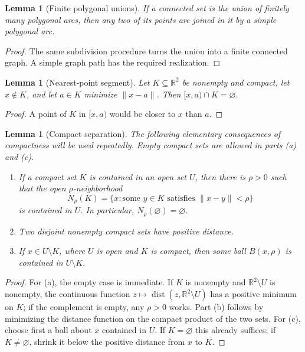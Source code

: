 \documentclass[11pt]{article}
\theoremstyle{mainplain}
\newtheorem{lemma}[theorem]{Lemma}
\theoremstyle{mainroman}
\newtheorem{longlemma}[theorem]{Lemma}
\theoremstyle{definition}
\newcommand{\alphlabels}{\renewcommand{\labelenumi}{\textup{(\alph{enumi})}}%
  \renewcommand{\theenumi}{\alph{enumi}}}
\numberwithin{equation}{section}
\begin{document}
\begin{lemma}[Finite polygonal unions]\label{lem:finite-polygonal-union}
If a connected set is the union of finitely many polygonal arcs, then
any two of its points are joined in it by a simple polygonal arc.
\end{lemma}
\begin{proof}
The same subdivision procedure turns the union into a finite connected
graph. A simple graph path has the required realization.
\end{proof}

\begin{lemma}[Nearest-point segment]\label{lem:nearest-segment}
Let $K\subseteq\mathbb R^2$ be nonempty and compact, let $x\notin K$,
and let $a\in K$ minimize $\|x-a\|$. Then
$[x,a)\cap K=\varnothing$.
\end{lemma}
\begin{proof}
A point of $K$ in $[x,a)$ would be closer to $x$ than $a$.
\end{proof}

\begin{longlemma}[Compact separation]\label{lem:compact-separation}
The following elementary consequences of compactness will be used
repeatedly. Empty compact sets are allowed in parts \textup{(a)} and
\textup{(c)}.
\begin{enumerate}\alphlabels
\item If a compact set $K$ is contained in an open set $U$, then there
      is $\rho>0$ such that the open $\rho$-neighborhood
      \[
        N_\rho(K)=\{x:\text{some }y\in K\text{ satisfies }\|x-y\|<\rho\}
      \]
      is contained in $U$. In particular,
      $N_\rho(\varnothing)=\varnothing$.
\item Two disjoint nonempty compact sets have positive distance.
\item If $x\in U\setminus K$, where $U$ is open and $K$ is compact,
      then some ball $B(x,\rho)$ is contained in $U\setminus K$.
\end{enumerate}
\end{longlemma}
\begin{proof}
For (a), the empty case is immediate. If $K$ is nonempty and
$\mathbb R^2\setminus U$ is nonempty, the continuous function
$z\mapsto\operatorname{dist}(z,\mathbb R^2\setminus U)$ has a
positive minimum on $K$; if the complement is empty, any $\rho>0$
works. Part (b) follows by minimizing the distance function on the
compact product of the two sets. For (c), choose first a ball about
$x$ contained in $U$. If $K=\varnothing$ this already suffices; if
$K\ne\varnothing$, shrink it below the positive distance from $x$ to
$K$.
\end{proof}
\end{document}

